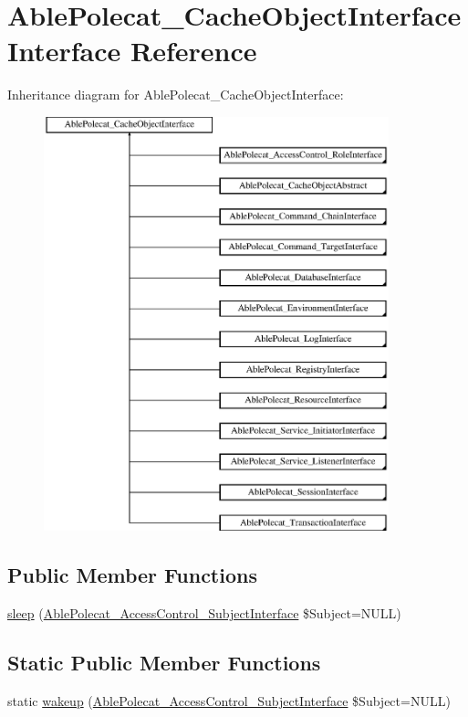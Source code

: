\hypertarget{interface_able_polecat___cache_object_interface}{}\section{Able\+Polecat\+\_\+\+Cache\+Object\+Interface Interface Reference}
\label{interface_able_polecat___cache_object_interface}
Inheritance diagram for Able\+Polecat\+\_\+\+Cache\+Object\+Interface\+:\begin{figure}[H]
\begin{center}
\leavevmode
\includegraphics[height=12.000000cm]{interface_able_polecat___cache_object_interface}
\end{center}
\end{figure}
\subsection*{Public Member Functions}
\begin{DoxyCompactItemize}
\item 
\hyperlink{interface_able_polecat___cache_object_interface_a365e24d7b066205cafa2a5cce3a4f224}{sleep} (\hyperlink{interface_able_polecat___access_control___subject_interface}{Able\+Polecat\+\_\+\+Access\+Control\+\_\+\+Subject\+Interface} \$Subject=N\+U\+L\+L)
\end{DoxyCompactItemize}
\subsection*{Static Public Member Functions}
\begin{DoxyCompactItemize}
\item 
static \hyperlink{interface_able_polecat___cache_object_interface_a3f2135f6ad45f51d075657f6d20db2cd}{wakeup} (\hyperlink{interface_able_polecat___access_control___subject_interface}{Able\+Polecat\+\_\+\+Access\+Control\+\_\+\+Subject\+Interface} \$Subject=N\+U\+L\+L)
\end{DoxyCompactItemize}


